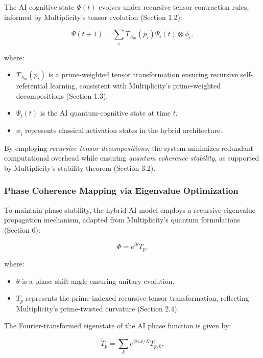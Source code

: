 \documentclass[12pt]{article}
\begin{document}
The AI cognitive state \(\Psi(t)\) evolves under recursive tensor contraction rules, informed by Multiplicity’s tensor evolution (Section 1.2):

\begin{equation}
    \Psi(t+1) = \sum_{i} T_{\Lambda_m}(p_i) \Psi_i(t) \otimes \phi_i,
\end{equation}

where:
\begin{itemize}
    \item \(T_{\Lambda_m}(p_i)\) is a prime-weighted tensor transformation ensuring recursive self-referential learning, consistent with Multiplicity’s prime-weighted decompositions (Section 1.3).
    \item \(\Psi_i(t)\) is the AI quantum-cognitive state at time \(t\).
    \item \(\phi_i\) represents classical activation states in the hybrid architecture.
\end{itemize}

By employing \textit{recursive tensor decompositions}, the system minimizes redundant computational overhead while ensuring \textit{quantum coherence stability}, as supported by Multiplicity’s stability theorem (Section 3.2).

\subsubsection{Phase Coherence Mapping via Eigenvalue Optimization}

To maintain phase stability, the hybrid AI model employs a recursive eigenvalue propagation mechanism, adapted from Multiplicity’s quantum formulations (Section 6):

\begin{equation}
    \Phi = e^{i\theta} T_p,
\end{equation}

where:
\begin{itemize}
    \item \(\theta\) is a phase shift angle ensuring unitary evolution.
    \item \(T_p\) represents the prime-indexed recursive tensor transformation, reflecting Multiplicity’s prime-twisted curvature (Section 2.4).
\end{itemize}

The Fourier-transformed eigenstate of the AI phase function is given by:

\begin{equation}
    \tilde{T}_p = \sum_{k} e^{i 2\pi k / N} T_{p,k},
\end{equation}
\end{document}
